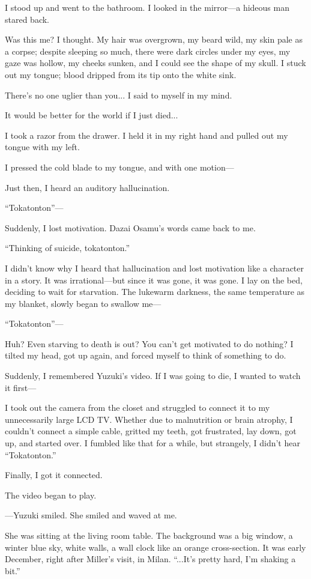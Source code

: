 \documentclass[
    a4paper,
    12pt,
    twoside,
    openany,
    UTF8,
    fontset=windows
]{ctexbook}
\begin{document}
I stood up and went to the bathroom. I looked in the mirror---a hideous man stared back.

Was this me? I thought. My hair was overgrown, my beard wild, my skin pale as a corpse; despite sleeping so much, there were dark circles under my eyes, my gaze was hollow, my cheeks sunken, and I could see the shape of my skull. I stuck out my tongue; blood dripped from its tip onto the white sink.

There's no one uglier than you... I said to myself in my mind.

It would be better for the world if I just died...

I took a razor from the drawer. I held it in my right hand and pulled out my tongue with my left.

I pressed the cold blade to my tongue, and with one motion---

Just then, I heard an auditory hallucination.

``Tokatonton''---

Suddenly, I lost motivation. Dazai Osamu's words came back to me.

``Thinking of suicide, tokatonton.''

I didn't know why I heard that hallucination and lost motivation like a character in a story. It was irrational---but since it was gone, it was gone. I lay on the bed, deciding to wait for starvation. The lukewarm darkness, the same temperature as my blanket, slowly began to swallow me---

``Tokatonton''---

Huh? Even starving to death is out? You can't get motivated to do nothing? I tilted my head, got up again, and forced myself to think of something to do.

Suddenly, I remembered Yuzuki's video. If I was going to die, I wanted to watch it first---

I took out the camera from the closet and struggled to connect it to my unnecessarily large LCD TV. Whether due to malnutrition or brain atrophy, I couldn't connect a simple cable, gritted my teeth, got frustrated, lay down, got up, and started over. I fumbled like that for a while, but strangely, I didn't hear ``Tokatonton.''

Finally, I got it connected.

The video began to play.

---Yuzuki smiled. She smiled and waved at me.

She was sitting at the living room table. The background was a big window, a winter blue sky, white walls, a wall clock like an orange cross-section. It was early December, right after Miller's visit, in Milan. ``...It's pretty hard, I'm shaking a bit.''
\end{document}
